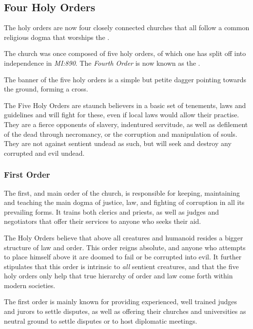 \subsection{Four Holy Orders}
\label{sec:Four Holy Orders}

The holy orders are now four closely connected churches that all follow a
common religious dogma that worships the .

The church was once composed of five holy orders, of which one has split off
into independence in \emph{MI:890}. The \emph{Fourth Order} is now known
as the .

The banner of the five holy orders is a simple but petite dagger pointing
towards the ground, forming a cross.

The Five Holy Orders are staunch believers in a basic set of tenements, laws
and guidelines and will fight for these, even if local laws would allow their
practise. They are a fierce opponents of slavery, indentured servitude, as
well as defilement of the dead through necromancy, or the corruption and
manipulation of souls. They are not against sentient undead as such, but will
seek and destroy any corrupted and evil undead.

\subsubsection{First Order}
\label{sec:First Order}

The first, and main order of the church, is responsible for keeping, maintaining
and teaching the main dogma of justice, law, and fighting of corruption in all
its prevailing forms. It trains both clerics and priests, as well as judges and
negotiators that offer their services to anyone who seeks their aid.

The Holy Orders believe that above all creatures and humanoid resides a bigger
structure of law and order. This order reigns absolute, and anyone who attempts
to place himself above it are doomed to fail or be corrupted into evil. It
further stipulates that this order is intrinsic to \emph{all} sentient
creatures, and that the five holy orders only help that true hierarchy of order
and law come forth within modern societies.

The first order is mainly known for providing experienced, well trained judges
and jurors to settle disputes, as well as offering their churches and
universities as neutral ground to settle disputes or to host diplomatic
meetings.


